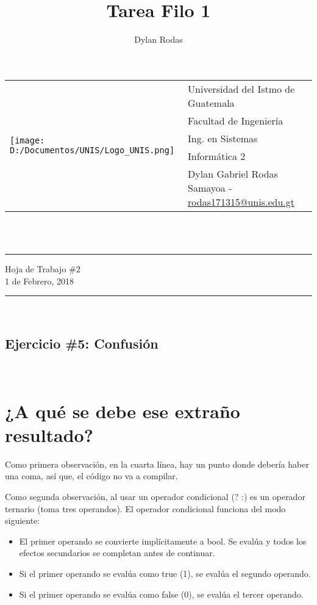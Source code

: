 \documentclass[10pt,a4paper]{article}
\author{Dylan Rodas}
\title{Tarea Filo 1}
\newcommand{\horrule}[1]{\rule{\linewidth}{#1}}
\begin{document}
	\begin{tabular}{l l}
     \multirow{5}{*}{\texttt{[image: D:/Documentos/UNIS/Logo\_UNIS.png]}} & Universidad del Istmo de Guatemala \\
     & Facultad de Ingenier\'ia \\
     & Ing. en Sistemas \\
     & Inform\'atica 2 \\
     & Dylan Gabriel Rodas Samayoa - \href{mailto:rodas171315@unis.edu.gt}{rodas171315@unis.edu.gt} \\
    \end{tabular}
	\\\    
	
    \begin{center}
        \horrule{0.5pt}
        \huge{Hoja de Trabajo \#2} \\
        \large{1 de Febrero, 2018} \\
        \horrule{1pt}
	\end{center}
	\
	\begin{center}
	\section*{Ejercicio \#5: Confusi\'on}
	\end{center}
	\
	\section*{¿A qu\'e se debe ese extraño resultado?}

\item{Como primera observaci\'on, en la cuarta l\'inea, hay un punto donde deber\'ia haber una coma, as\'i que, el c\'odigo no va a compilar.}
\item{Como segunda observaci\'on, al usar un operador condicional (? :) es un operador ternario (toma tres operandos). El operador condicional funciona del modo siguiente:}

	\begin{itemize}
\item{El primer operando se convierte implícitamente a bool. Se evalúa y todos los efectos secundarios se completan antes de continuar.}
\item{Si el primer operando se evalúa como true (1), se evalúa el segundo operando.}
\item{Si el primer operando se evalúa como false (0), se evalúa el tercer operando.}
    \end{itemize}
\end{document}
